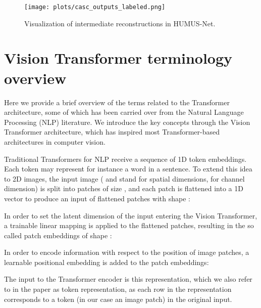 \begin{figure}
	\centering
	\texttt{[image: plots/casc\_outputs\_labeled.png]}	
	\caption{Visualization of intermediate reconstructions in HUMUS-Net. \label{fig:apx_casc_vis}}
\end{figure}

\section{Vision Transformer terminology overview \label{apx:vit_term}}
Here we provide a brief overview of the terms related to the Transformer architecture, some of which has been carried over from the Natural Language Processing (NLP) literature.  We introduce the key concepts through the Vision Transformer architecture, which has inspired most Transformer-based architectures in computer vision.

Traditional Transformers for NLP receive a sequence of 1D token embeddings. Each token may represent for instance a word in a sentence. To extend this idea to 2D images, the input  image ( and  stand for spatial dimensions,  for channel dimension) is split into  patches of size , and each patch is flattened into a 1D vector to produce an input of flattened patches  with shape :

 In order to set the latent dimension of the input entering the Vision Transformer, a trainable linear mapping  is applied to the flattened patches, resulting in the so called patch embeddings  of shape :
 
 In order to encode information with respect to the position of image patches, a learnable positional embedding  is added to the patch embeddings:
 
 
 The input to the Transformer encoder is this  representation, which we also refer to in the paper as token representation, as each row in the representation corresponds to a token (in our case an image patch) in the original input.  
\newpage
